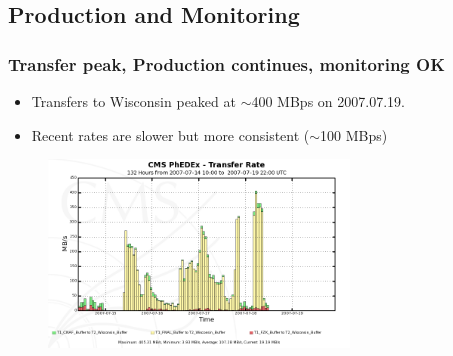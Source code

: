 \documentclass{beamer}
\newcommand{\ca}{\ensuremath{\sim}}
\begin{document}
\subsection{Production and Monitoring}
\begin{frame}
\frametitle{Transfer peak, Production continues, monitoring OK}
\begin{itemize}
    \item Transfers to Wisconsin peaked at \ca{}400 MBps on 2007.07.19.
    \item Recent rates are slower but more consistent (\ca{}100 MBps)
\end{itemize}
\begin{figure}
    \includegraphics*[height=5cm]{Graphics/phedex_071907.png}
\end{figure}
\end{frame}
\end{document}
